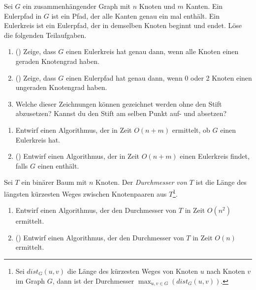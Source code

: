 \documentclass{uebung_cs}
\begin{document}
\begin{aufgabe}
	Sei $G$ ein zusammenhängender Graph mit $n$ Knoten und $m$ Kanten.
	Ein Eulerpfad in $G$ ist ein Pfad, der alle Kanten genau ein mal enthält.
	Ein Eulerkreis ist ein Eulerpfad, der in demselben Knoten beginnt und endet.
	Löse die folgenden Teilaufgaben.
	\begin{enumerate}
		\item (\hard) Zeige, dass $G$ einen Eulerkreis hat genau dann, wenn alle Knoten einen geraden Knotengrad haben.
		\item (\hard) Zeige, dass $G$ einen Eulerpfad hat genau dann, wenn 0 oder 2 Knoten einen ungeraden Knotengrad haben.
		\item Welche dieser Zeichnungen können gezeichnet werden ohne den Stift abzusetzen?
		Kannst du den Stift am selben Punkt auf- und absetzen?
	\end{enumerate}
	\begin{center}
		\hspace{1.5cm}
		\hspace{1.5cm}
	\end{center}
	\begin{enumerate}[resume]
		\item Entwirf einen Algorithmus, der in Zeit $O(n+m)$ ermittelt, ob $G$ einen Eulerkreis hat.
		\item (\hard) Entwirf einen Algorithmus, der in Zeit $O(n+m)$ einen Eulerkreis findet, falls $G$ einen enthält.
	\end{enumerate}	
\end{aufgabe}


\begin{aufgabe}
	Sei $T$ ein binärer Baum mit $n$ Knoten.
	Der \textit{Durchmesser von $T$} ist die Länge des längsten kürzesten Weges zwischen Knotenpaaren aus $T$\footnote{Sei $dist_G(u,v)$ die Länge des kürzesten Weges von Knoten $u$ nach Knoten $v$ im Graph $G$, dann ist der Durchmesser $\max_{u,v\in G}( dist_G(u,v) )$.}.
	\begin{enumerate}
		\item Entwirf einen Algorithmus, der den Durchmesser von $T$ in Zeit $O(n^2)$ ermittelt.
		\item (\hard) Entwirf einen Algorithmus, der den Durchmesser von $T$ in Zeit $O(n)$ ermittelt.
	\end{enumerate}
\end{aufgabe}
\end{document}
